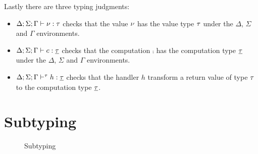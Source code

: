{Lastly there are three typing judgments:
\begin{itemize}
\setlength\itemsep{0.5em}
\item $\Delta;\Sigma;\Gamma \vdash \nu : \tau$ checks that the value $\nu$ has the value type $\tau$ under the $\Delta$, $\Sigma$ and $\Gamma$ environments.
\item $\Delta;\Sigma;\Gamma \vdash c : \underline{\tau}$ checks that the computation $\comp$ has the computation type $\underline{\tau}$ under the $\Delta$, $\Sigma$ and $\Gamma$ environments.
\item $\Delta;\Sigma;\Gamma \vdash^{\tau} h : \underline{\tau}$ checks that the handler $h$ transform a return value of type $\tau$ to the computation type $\underline{\tau}$.
\end{itemize}

\section{Subtyping}
\begin{figure}
\caption{Subtyping}
\centering
{}
\end{figure}

}

